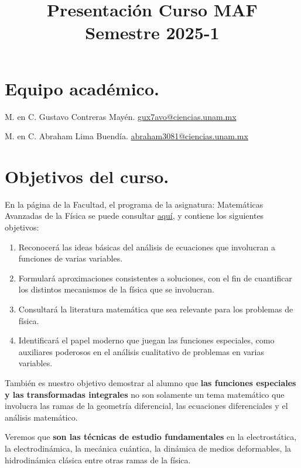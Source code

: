 \documentclass[14pt]{extarticle}
\title{Presentación Curso MAF \\ \large{Semestre 2025-1}\vspace{-3ex}}
\author{}
\date{ }
\numberwithin{equation}{section}
\begin{document}
\vspace{-4cm}
\maketitle

\section{Equipo académico.}

M. en C. Gustavo Contreras Mayén. \hspace{0.3cm} \href{mailto:gux7avo@ciencias.unam.mx}{gux7avo@ciencias.unam.mx}

M. en C. Abraham Lima Buendía. \hspace{0.3cm} \href{mailto:abraham3081@ciencias.unam.mx}{abraham3081@ciencias.unam.mx}

\section{Objetivos del curso.}

En la página de la Facultad, el programa de la asignatura: Matemáticas Avanzadas de la Física se puede consultar 
\href{https://www.fciencias.unam.mx/sites/default/files/temario/610.pdf}{aquí}, y contiene los siguientes objetivos:
\begin{enumerate}
\item Reconocerá las ideas básicas del análisis de ecuaciones que involucran a funciones de varias variables.
\item Formulará aproximaciones consistentes a soluciones, con el fin de cuantificar los distintos mecanismos de la física que se involucran.
\item Consultará la literatura matemática que sea relevante para los problemas de física.
\item Identificará el papel moderno que juegan las funciones especiales, como auxiliares poderosos en el análisis cualitativo de problemas en varias variables.
\end{enumerate}

También es nuestro objetivo demostrar al alumno que \textbf{las funciones especiales y las transformadas integrales} no son solamente un tema matemático que involucra las ramas de la geometría diferencial, las ecuaciones diferenciales y el análisis matemático.

Veremos que \textbf{son las técnicas de estudio fundamentales} en la electrostática, la electrodinámica, la mecánica cuántica, la dinámica de medios deformables, la hidrodinámica clásica entre otras ramas de la física.
\end{document}
